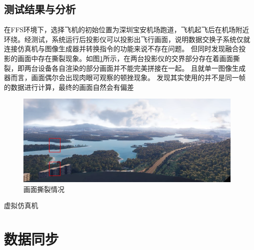 \subsection{测试结果与分析}
在FFS环境下，选择飞机的初始位置为深圳宝安机场跑道，飞机起飞后在机场附近环绕。经测试，系统运行后投影仪可以投影出飞行画面，说明数据交换子系统仅就连接仿真机与图像生成器并转换指令的功能来说不存在问题。
但同时发现融合投影的画面中存在撕裂现象。如图\ref{tear}所示，在两台投影仪的交界部分存在着画面撕裂，即两台设备各自渲染的部分画面并不能完美拼接在一起。
且就单一图像生成器而言，画面偶尔会出现肉眼可观察的顿挫现象。
发现其实使用的并不是同一帧的数据进行计算，最终的画面自然会有偏差
\begin{figure}[h!]
    \begin{center}
        \includegraphics[width=\textwidth]{pictures/tearmark.png}
        \caption{画面撕裂情况}
        \label{tear}
    \end{center}
\end{figure}
\par
虚拟仿真机
\section{数据同步}

